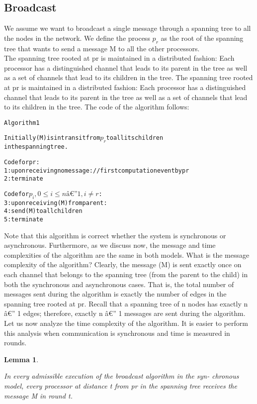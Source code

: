 \documentclass{article}
\newtheorem{lem}[thm]{Lemma}
\newenvironment{lemma}{\begin{lem}\begin{rm}}%
{\end{rm}\end{lem}}
\begin{document}
\subsection{Broadcast}
We assume we want to broadcast a single message through a spanning tree to all the nodes in the network. We define the process $p_r$ as the root of the spanning tree that wants to send a message M to all the other processors.\\
The spanning tree rooted at pr is maintained in 
a distributed fashion: Each processor has a distinguished channel that leads to its 
parent in the tree as well as a set of channels that lead to its children in the tree. 
The spanning tree rooted at pr is maintained in 
a distributed fashion: Each processor has a distinguished channel that leads to its 
parent in the tree as well as a set of channels that lead to its children in the tree. 
The code of the algorithm follows:
\begin{alltt}
Algorithm 1

Initially (M) is in transit from \(p_r\) to all its children
in the spanning tree.
 
Code for pr: 
	1: upon receiving no message: // first computation event by pr 
	2: terminate
	 
Code for \(p_i, 0 \leq i \leq n â€” 1, i \neq r\): 
	3: upon receiving (M) from parent: 
	4: send (M) to all children 
	5: terminate 
\end{alltt}
Note that this algorithm is correct whether the system is synchronous or asynchronous. Furthermore, as we discuss now, the message and time complexities of the 
algorithm are the same in both models. 
What is the message complexity of the algorithm? Clearly, the message (M) is 
sent exactly once on each channel that belongs to the spanning tree (from the parent to 
the child) in both the synchronous and asynchronous cases. That is, the total number 
of messages sent during the algorithm is exactly the number of edges in the spanning 
tree rooted at pr. Recall that a spanning tree of n nodes has exactly n â€” 1 edges; 
therefore, exactly n â€” 1 messages are sent during the algorithm. \\
Let us now analyze the time complexity of the algorithm. It is easier to perform 
this analysis when communication is synchronous and time is measured in rounds. \\

\begin{lemma}
In every admissible execution of the broadcast algorithm in the syn- chronous model, every processor at distance t from pr in the spanning tree receives the message M in round t. 
\end{lemma}
\end{document}
